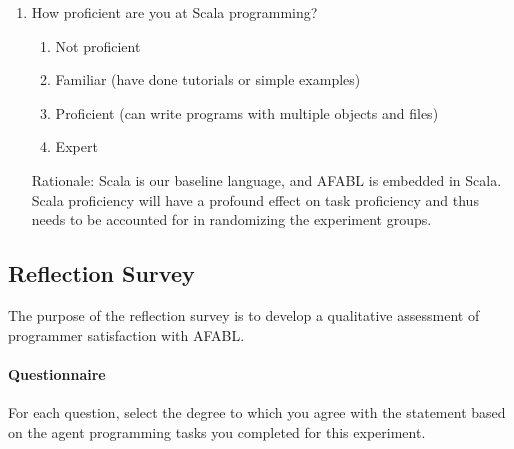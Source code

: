 \begin{enumerate}
\item How proficient are you at Scala programming?  
\begin{enumerate}
\item Not proficient
\item Familiar (have done tutorials or simple examples)
\item Proficient (can write programs with multiple objects and files)
\item Expert
\end{enumerate}

Rationale: Scala is our baseline language, and AFABL is embedded in Scala.  Scala proficiency will have a profound effect on task proficiency and thus needs to be accounted for in randomizing the experiment groups.

\end{enumerate}


\subsection{Reflection Survey}

The purpose of the reflection survey is to develop a qualitative assessment of programmer satisfaction with AFABL.

\paragraph{Questionnaire}

For each question, select the degree to which you agree with the statement based on
the agent programming tasks you completed for this experiment.

